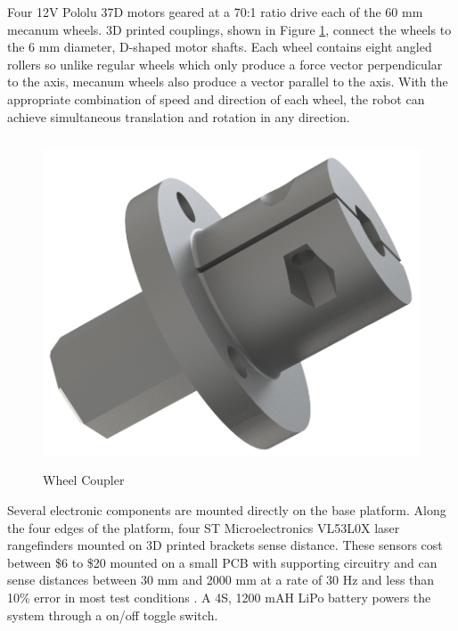 Four 12V Pololu 37D motors geared at a 70:1 ratio drive each of the 60 mm mecanum wheels. 3D printed couplings, shown in Figure \ref{fig:wheel_coupler}, connect the wheels to the 6 mm diameter, D-shaped motor shafts. Each wheel contains eight angled rollers so unlike regular wheels which only produce a force vector perpendicular to the axis, mecanum wheels also produce a vector parallel to the axis. With the appropriate combination of speed and direction of each wheel, the robot can achieve simultaneous translation and rotation in any direction. 

\begin{figure}[H]   %
	\centering \includegraphics[width=6in, height=3.85in, keepaspectratio]{figures/wheel_coupler.png}
	\caption{Wheel Coupler}	\label{fig:wheel_coupler}
\end{figure}

Several electronic components are mounted directly on the base platform. Along the four edges of the platform, four ST Microelectronics VL53L0X laser rangefinders mounted on 3D printed brackets sense distance. These sensors cost between \$6 to \$20 mounted on a small PCB with supporting circuitry and can sense distances between 30 mm and 2000 mm at a rate of 30 Hz and less than 10\% error in most test conditions \cite{vl53l0x_datasheet}. A 4S, 1200 mAH LiPo battery powers the system through a on/off toggle switch. 


